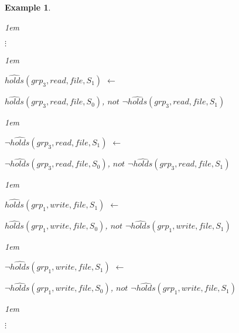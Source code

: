 \documentclass[11pt]{report}
\newtheorem{vexample}{Example}[chapter]
\newenvironment{vquote}
{
  \begin{list}{}{\leftmargin 1em}\item[]
}
{
  \end{list}
}
\begin{document}
\begin{vexample}
\begin{enumerate}
              \begin{vquote}
                \hspace{2em}$\vdots$
              \end{vquote}

              \begin{vquote}
                $\hat{holds}(grp_3, read, file, S_{1})$ $\leftarrow$

                \hspace{1em}
                $\hat{holds}(grp_3, read, file, S_{0})$,
                $not$ $\lnot\hat{holds}(grp_3, read, file, S_{1})$
              \end{vquote}

              \begin{vquote}
                $\lnot\hat{holds}(grp_3, read, file, S_{1})$ $\leftarrow$

                \hspace{1em}
                $\lnot\hat{holds}(grp_3, read, file, S_{0})$,
                $not$ $\lnot\hat{holds}(grp_3, read, file, S_{1})$
              \end{vquote}

              \begin{vquote}
                $\hat{holds}(grp_1, write, file, S_{1})$ $\leftarrow$

                \hspace{1em}
                $\hat{holds}(grp_1, write, file, S_{0})$,
                $not$ $\lnot\hat{holds}(grp_1, write, file, S_{1})$
              \end{vquote}

              \begin{vquote}
                $\lnot\hat{holds}(grp_1, write, file, S_{1})$ $\leftarrow$

                \hspace{1em}
                $\lnot\hat{holds}(grp_1, write, file, S_{0})$,
                $not$ $\lnot\hat{holds}(grp_1, write, file, S_{1})$
              \end{vquote}

              \begin{vquote}
                \hspace{2em}$\vdots$
              \end{vquote}


\end{enumerate}
\end{vexample}
\end{document}
